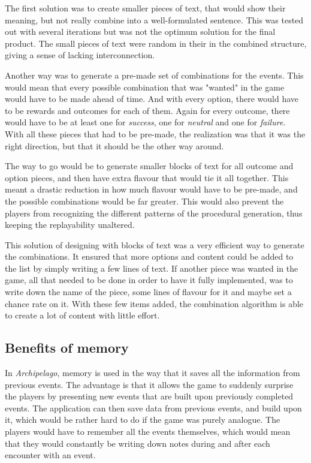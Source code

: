 The first solution was to create smaller pieces of text, that would show their meaning, but not really combine into a well-formulated sentence. This was tested out with several iterations but was not the optimum solution for the final product. The small pieces of text were random in their in the combined structure, giving a sense of lacking interconnection.

Another way was to generate a pre-made set of combinations for the events. This would mean that every possible combination that was "wanted" in the game would have to be made ahead of time. And with every option, there would have to be rewards and outcomes for each of them. Again for every outcome, there would have to be at least one for \textit{success}, one for \textit{neutral} and one for \textit{failure}. 
With all these pieces that had to be pre-made, the realization was that it was the right direction, but that it should be the other way around. 

The way to go would be to generate smaller blocks of text for all outcome and option pieces, and then have extra flavour that would tie it all together. This meant a drastic reduction in how much flavour would have to be pre-made, and the possible combinations would be far greater. This would also prevent the players from recognizing the different patterns of the procedural generation, thus keeping the replayability unaltered.

This solution of designing with blocks of text was a very efficient way to generate the combinations. It ensured that more options and content could be added to the list by simply writing a few lines of text. If another piece was wanted in the game, all that needed to be done in order to have it fully implemented, was to write down the name of the piece, some lines of flavour for it and maybe set a chance rate on it. With these few items added, the combination algorithm is able to create a lot of content with little effort.

\subsection{Benefits of memory}
In \textit{Archipelago}, memory is used in the way that it saves all the information from previous events.
The advantage is that it allows the game to suddenly surprise the players by presenting new events that are built upon previously completed events. The application can then save data from previous events, and build upon it, which would be rather hard to do if the game was purely analogue. The players would have to remember all the events themselves, which would mean that they would constantly be writing down notes during and after each encounter with an event. 

